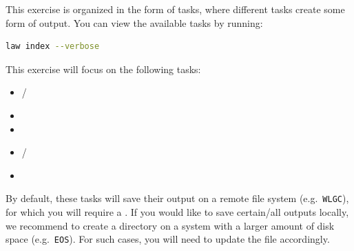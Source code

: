 
This exercise is organized in the form of  tasks, where different tasks create some form of output. You can view the available tasks by running:
\begin{lstlisting}[language=bash]
law index --verbose
\end{lstlisting}

This exercise will focus on the following tasks:

\begin{itemize}
    \item {} / 
    \item {}
    \item {}
    \item {} / 
    \item {}
\end{itemize}

By default, these tasks will save their output on a remote file system (e.g.\ \texttt{WLGC}), for which you will require a . If you would like to save certain/all outputs locally, we recommend to create a directory on a system with a larger amount of disk space (e.g.\ \texttt{EOS}). For such cases, you will need to update the  file accordingly.

